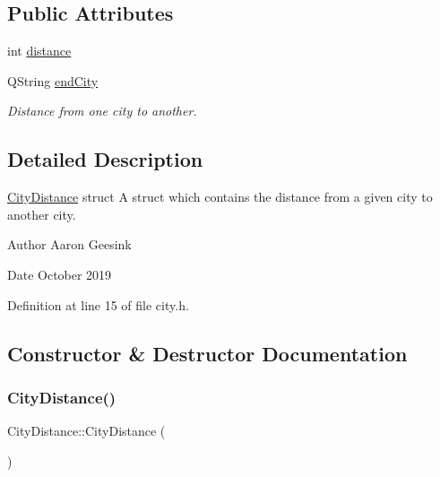 \subsection*{Public Attributes}
\begin{DoxyCompactItemize}
\item 
int \mbox{\hyperlink{struct_city_distance_aabe1e1bba711dab73cd70f1105c35c9e}{distance}}
\item 
Q\+String \mbox{\hyperlink{struct_city_distance_a7f1fe8d0c76af2abf5bc5c6bd1800e7f}{end\+City}}
\begin{DoxyCompactList}\small\item\em Distance from one city to another. \end{DoxyCompactList}\end{DoxyCompactItemize}


\subsection{Detailed Description}
\mbox{\hyperlink{struct_city_distance}{City\+Distance}} struct A struct which contains the distance from a given city to another city. 

\begin{DoxyAuthor}{Author}
Aaron Geesink 
\end{DoxyAuthor}
\begin{DoxyDate}{Date}
October 2019 
\end{DoxyDate}


Definition at line 15 of file city.\+h.



\subsection{Constructor \& Destructor Documentation}
\mbox{\label{struct_city_distance_aa486f287fb876e7aec9d41340a9a2b62}} 
\subsubsection{\texorpdfstring{CityDistance()}{CityDistance()}\hspace{0.1cm}{\footnotesize\ttfamily [1/2]}}
{\footnotesize\ttfamily City\+Distance\+::\+City\+Distance (\begin{DoxyParamCaption}{ }\end{DoxyParamCaption})\hspace{0.3cm}{\ttfamily [inline]}}



